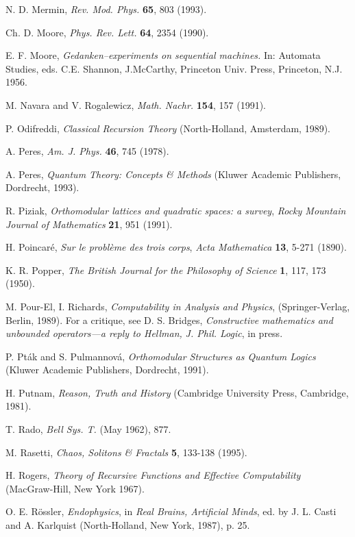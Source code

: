 \begin{thebibliography}{99}
N. D. Mermin,
{\sl Rev. Mod. Phys.} {\bf 65}, 803 (1993).


 Ch. D. Moore, {\sl Phys. Rev. Lett.} {\bf 64}, 2354 (1990).

 E. F. Moore, {\it Gedanken--experiments on
sequential machines.} In: Automata Studies, eds. C.E. Shannon, J.McCarthy,
Princeton Univ. Press, Princeton, N.J. 1956.

M. Navara and V. Rogalewicz, {\sl Math. Nachr.} {\bf 154}, 157 (1991).


P. Odifreddi, {\sl Classical Recursion Theory}
(North-Holland, Amsterdam, 1989).

 A. Peres, {\sl Am. J. Phys.} {\bf 46}, 745 (1978).

A. Peres,
{\sl Quantum Theory: Concepts \& Methods}
(Kluwer Academic Publishers, Dordrecht, 1993).

R. Piziak, {\sl Orthomodular lattices and quadratic spaces: a survey},
{\sl Rocky Mountain Journal of Mathematics} {\bf 21}, 951 (1991).


H. Poincar\'{e}, {\it Sur le probl\`{e}me des trois corps}, {\sl Acta
Mathematica} {\bf 13}, 5-271 (1890).

 K. R. Popper, {\sl The British Journal for the Philosophy of Science}
 {\bf 1}, 117, 173 (1950).

 M. Pour-El, I. Richards, {\sl
Computability in Analysis and Physics},
 (Springer-Verlag, Berlin,  1989). For a critique, see
D. S. Bridges, {\it Constructive mathematics and unbounded operators---a
reply to Hellman,}
{\sl J. Phil. Logic}, in press.

 P. Pt\'{a}k and S. Pulmannov\'{a},
 {\sl Orthomodular Structures as Quantum Logics}
 (Kluwer Academic Publishers, Dordrecht, 1991).

H. Putnam,
{\sl Reason, Truth and History}
(Cambridge University Press,
Cambridge, 1981).


 T. Rado, {\sl Bell Sys. T.} (May 1962), 877.

M. Rasetti, {\sl Chaos, Solitons \& Fractals} {\bf 5}, 133-138 (1995).

H. Rogers, {\sl Theory of Recursive Functions and Effective
Computability} (MacGraw-Hill, New York 1967).


 O. E. R\"ossler,
{\sl Endophysics}, in {\sl Real Brains, Artificial
 Minds}, ed. by J. L. Casti and A. Karlquist (North-Holland, New
 York, 1987), p. 25.


\end{thebibliography}
